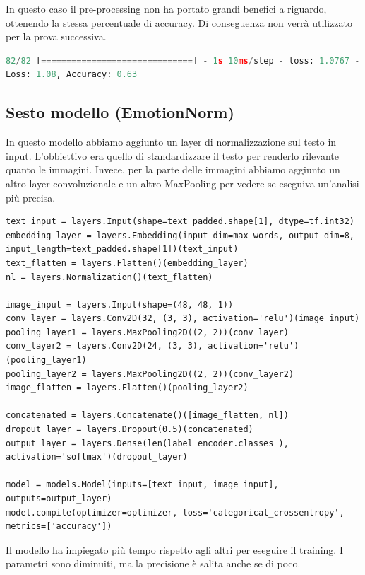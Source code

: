 \documentclass{article}
\begin{document}
In questo caso il pre-processing non ha portato grandi benefici a riguardo, ottenendo la stessa percentuale di accuracy. Di conseguenza non verrà utilizzato per la prova successiva.
\begin{lstlisting}[language=Python, caption=Risultati modello normalizzazione migliorata]
82/82 [==============================] - 1s 10ms/step - loss: 1.0767 - accuracy: 0.6256 - precision_16: 0.7433 - recall_16: 0.4981
Loss: 1.08, Accuracy: 0.63
\end{lstlisting}


\subsection{Sesto modello (EmotionNorm)}
In questo modello abbiamo aggiunto un layer di normalizzazione sul testo in input. L'obbiettivo era quello di standardizzare il testo per renderlo rilevante quanto le immagini. Invece, per la parte delle immagini abbiamo aggiunto un altro layer convoluzionale e un altro MaxPooling per vedere se eseguiva un'analisi più precisa. 

\begin{lstlisting}
text_input = layers.Input(shape=text_padded.shape[1], dtype=tf.int32)
embedding_layer = layers.Embedding(input_dim=max_words, output_dim=8, input_length=text_padded.shape[1])(text_input)
text_flatten = layers.Flatten()(embedding_layer)
nl = layers.Normalization()(text_flatten)

image_input = layers.Input(shape=(48, 48, 1))
conv_layer = layers.Conv2D(32, (3, 3), activation='relu')(image_input)
pooling_layer1 = layers.MaxPooling2D((2, 2))(conv_layer)
conv_layer2 = layers.Conv2D(24, (3, 3), activation='relu')(pooling_layer1)
pooling_layer2 = layers.MaxPooling2D((2, 2))(conv_layer2)
image_flatten = layers.Flatten()(pooling_layer2)

concatenated = layers.Concatenate()([image_flatten, nl])
dropout_layer = layers.Dropout(0.5)(concatenated)
output_layer = layers.Dense(len(label_encoder.classes_), activation='softmax')(dropout_layer)

model = models.Model(inputs=[text_input, image_input], outputs=output_layer)
model.compile(optimizer=optimizer, loss='categorical_crossentropy', metrics=['accuracy'])
\end{lstlisting}

Il modello ha impiegato più tempo rispetto agli altri per eseguire il training. I parametri sono diminuiti, ma la precisione è salita anche se di poco.
\end{document}
